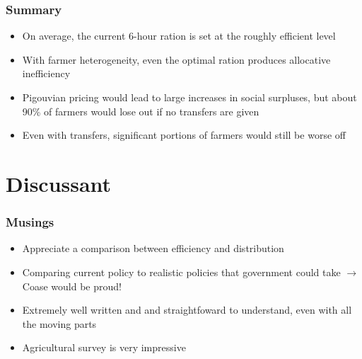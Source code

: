 \documentclass[handout,aspectratio=169]{beamer} %
\begin{document}
\begin{frame}
    \frametitle{Summary}
    \begin{itemize}
        \item On average, the current 6-hour ration is set at the roughly efficient level
        \item With farmer heterogeneity, even the optimal ration produces allocative inefficiency
        \item Pigouvian pricing would lead to large increases in social surpluses, but about 90\% of farmers would lose out if no transfers are given 
        \item Even with transfers, significant portions of farmers would still be worse off 
    \end{itemize}
\end{frame}

\section{Discussant} 
\begin{frame}
    \frametitle{Musings}
    \begin{itemize}
        \item Appreciate a comparison between efficiency and distribution
        \item Comparing current policy to realistic policies that government could take $\rightarrow$ Coase would be proud!
        \item Extremely well written and and straightfoward to understand, even with all the moving parts 
        \item Agricultural survey is very impressive
    \end{itemize}
\end{frame}
\end{document}
